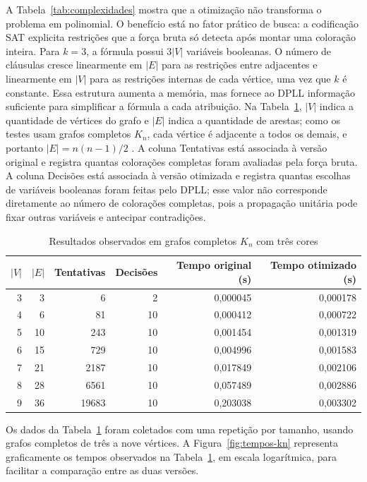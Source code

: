 A Tabela~\ref{tab:complexidades} mostra que a otimização não transforma o problema em polinomial. O benefício está no fator prático de busca: a codificação SAT explicita restrições que a força bruta só detecta após montar uma coloração inteira. Para $k=3$, a fórmula possui $3|V|$ variáveis booleanas. O número de cláusulas cresce linearmente em $|E|$ para as restrições entre adjacentes e linearmente em $|V|$ para as restrições internas de cada vértice, uma vez que $k$ é constante. Essa estrutura aumenta a memória, mas fornece ao DPLL informação suficiente para simplificar a fórmula a cada atribuição. Na Tabela~\ref{tab:resultados-kn}, $|V|$ indica a quantidade de vértices do grafo e $|E|$ indica a quantidade de arestas; como os testes usam grafos completos $K_n$, cada vértice é adjacente a todos os demais, e portanto $|E|=n(n-1)/2$ \parencite{Silva2026PAA13}. A coluna Tentativas está associada à versão original e registra quantas colorações completas foram avaliadas pela força bruta. A coluna Decisões está associada à versão otimizada e registra quantas escolhas de variáveis booleanas foram feitas pelo DPLL; esse valor não corresponde diretamente ao número de colorações completas, pois a propagação unitária pode fixar outras variáveis e antecipar contradições.

\begin{table}[htbp]
\centering
\caption{Resultados observados em grafos completos $K_n$ com três cores}
\label{tab:resultados-kn}
\small
\begin{tabular}{rrrrrr}
\hline
\textbf{$|V|$} & \textbf{$|E|$} & \textbf{Tentativas} & \textbf{Decisões} & \textbf{Tempo original (s)} & \textbf{Tempo otimizado (s)} \\
\hline
3 & 3  & 6     & 2  & 0,000045 & 0,000178 \\
4 & 6  & 81    & 10 & 0,000412 & 0,000722 \\
5 & 10 & 243   & 10 & 0,001454 & 0,001319 \\
6 & 15 & 729   & 10 & 0,004996 & 0,001583 \\
7 & 21 & 2187  & 10 & 0,017849 & 0,002106 \\
8 & 28 & 6561  & 10 & 0,057489 & 0,002886 \\
9 & 36 & 19683 & 10 & 0,203038 & 0,003302 \\
\hline
\end{tabular}
\end{table}

Os dados da Tabela~\ref{tab:resultados-kn} foram coletados com uma repetição por tamanho, usando grafos completos de três a nove vértices. A Figura~\ref{fig:tempos-kn} representa graficamente os tempos observados na Tabela~\ref{tab:resultados-kn}, em escala logarítmica, para facilitar a comparação entre as duas versões.


